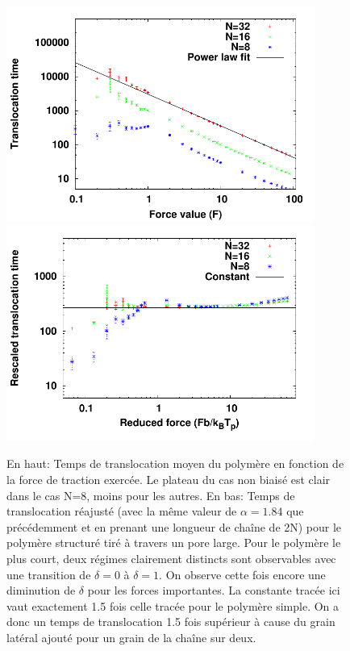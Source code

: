 \begin{figure}[H]
\begin{center}
\includegraphics[width=0.9\textwidth]{translocholebigger.pdf} 
\includegraphics[width=0.9\textwidth]{transloctaufrescholebigger.pdf} 
\caption[Temps de translocations du polymère structuré avec un pore large]{En haut: Temps de translocation moyen du polymère en fonction de la force de traction exercée. Le plateau du cas non biaisé est clair dans le cas N=8, moins pour les autres. En bas: Temps de translocation réajusté (avec la même valeur de $\alpha=1.84$ que précédemment et en prenant une longueur de chaîne de 2N) pour le polymère structuré tiré à travers un pore large. Pour le polymère le plus court, deux régimes clairement distincts sont observables avec une transition de $\delta=0$ à $\delta=1$. On observe cette fois encore une diminution de $\delta$ pour les forces importantes. La constante tracée ici vaut exactement 1.5 fois celle tracée pour le polymère simple. On a donc un temps de translocation 1.5 fois supérieur à cause du grain latéral ajouté pour un grain de la chaîne sur deux.}
\label{holebiggertau}
\end{center}
\end{figure}

